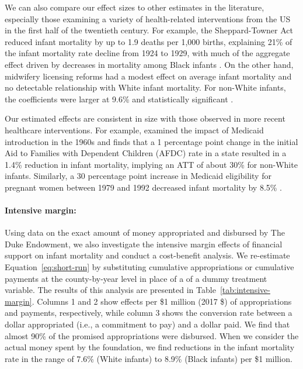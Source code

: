 \documentclass[12pt]{article}
\begin{document}
We can also compare our effect sizes to other estimates in the literature, especially those examining a variety of health-related interventions from the US in the first half of the twentieth century.
For example, the Sheppard-Towner Act reduced infant mortality by up to 1.9 deaths per 1,000 births, explaining 21\% of the infant mortality rate decline from 1924 to 1929, with much of the aggregate effect driven by decreases in mortality among Black infants . On the other hand, midwifery licensing reforms had a modest effect on average infant mortality and no detectable relationship with White infant mortality. For non-White infants, the coefficients were larger at 9.6\% and statistically significant .

Our estimated effects are consistent in size with those observed in more recent healthcare interventions.
For example,  examined the impact of Medicaid introduction in the 1960s and finds that a 1 percentage point change in the initial Aid to Families with Dependent Children (AFDC) rate in a state resulted in a 1.4\% reduction in infant mortality, implying an ATT of about 30\% for non-White infants. Similarly, a 30 percentage point increase in Medicaid eligibility for pregnant women between 1979 and 1992 decreased infant mortality by 8.5\% . 


\paragraph{Intensive margin:} Using data on the exact amount of money appropriated and disbursed by The Duke Endowment, we also investigate the intensive margin effects of financial support on infant mortality and conduct a cost-benefit analysis. 
We re-estimate Equation~\ref{eq:short-run} by substituting  cumulative appropriations or cumulative payments at the county-by-year level in place of a of a dummy treatment variable. 
The results of this analysis are presented in Table~\ref{tab:intensive-margin}.
Columns 1 and 2 show effects per \$1 million (2017 \$) of appropriations and payments, respectively, while column 3 shows the conversion rate between a dollar appropriated (i.e., a commitment to pay) and a dollar paid.
We find that almost 90\% of the promised appropriations were disbursed. 
When we consider the actual money spent by the foundation, we find reductions in the infant mortality rate in the range of 7.6\% (White infants) to 8.9\% (Black infants) per \$1 million. 
\end{document}
